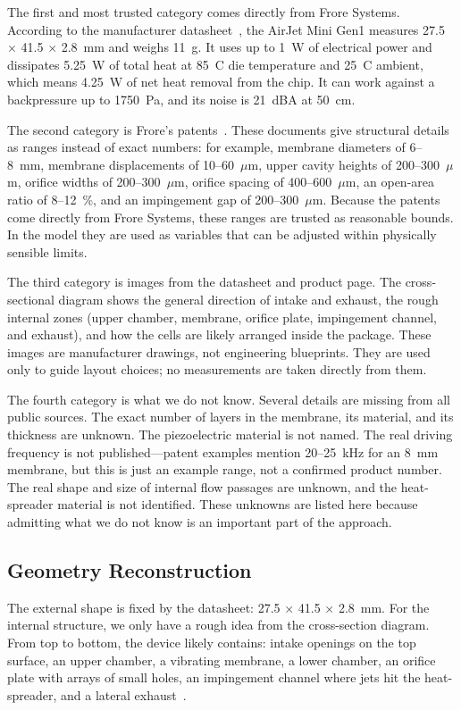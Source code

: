 \documentclass[11pt]{article}
\begin{document}
The first and most trusted category comes directly from Frore Systems.
According to the manufacturer datasheet~\cite{frore_datasheet}, the
AirJet Mini Gen1 measures 27.5 $\times$ 41.5 $\times$ 2.8~mm and weighs
11~g. It uses up to 1~W of electrical power and dissipates 5.25~W of
total heat at 85~\textdegree{}C die temperature and 25~\textdegree{}C
ambient, which means 4.25~W of net heat removal from the chip. It can
work against a backpressure up to 1750~Pa, and its noise is 21~dBA at
50~cm.

The second category is Frore's patents~\cite{us12137540b2,us11978690b2}.
These documents give structural details as ranges instead of exact
numbers: for example, membrane diameters of 6--8~mm, membrane
displacements of 10--60~$\mu$m, upper cavity heights of 200--300~$\mu$m,
orifice widths of 200--300~$\mu$m, orifice spacing of 400--600~$\mu$m,
an open-area ratio of 8--12~\%, and an impingement gap of 200--300~$\mu$m.
Because the patents come directly from Frore Systems, these ranges are
trusted as reasonable bounds. In the model they are used as variables
that can be adjusted within physically sensible limits.

The third category is images from the datasheet and product page. The
cross-sectional diagram shows the general direction of intake and
exhaust, the rough internal zones (upper chamber, membrane, orifice
plate, impingement channel, and exhaust), and how the cells are likely
arranged inside the package. These images are manufacturer drawings, not
engineering blueprints. They are used only to guide layout choices; no
measurements are taken directly from them.

The fourth category is what we do not know. Several details are missing
from all public sources. The exact number of layers in the membrane, its
material, and its thickness are unknown. The piezoelectric material is
not named. The real driving frequency is not published---patent examples
mention 20--25~kHz for an 8~mm membrane, but this is just an example
range, not a confirmed product number. The real shape and size of
internal flow passages are unknown, and the heat-spreader material is
not identified. These unknowns are listed here because admitting what
we do not know is an important part of the approach.

\subsection{Geometry Reconstruction}

The external shape is fixed by the datasheet: 27.5 $\times$ 41.5
$\times$ 2.8~mm. For the internal structure, we only have a rough idea
from the cross-section diagram. From top to bottom, the device likely
contains: intake openings on the top surface, an upper chamber, a
vibrating membrane, a lower chamber, an orifice plate with arrays of
small holes, an impingement channel where jets hit the heat-spreader,
and a lateral exhaust~\cite{frore_datasheet,us12137540b2}.
\end{document}
